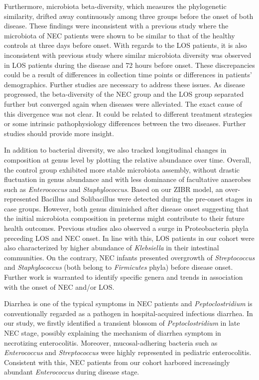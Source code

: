\documentclass[fleqn,10pt, lineno]{wlpeerj} %
\begin{document}
Furthermore, microbiota beta-diversity, which measures the phylogenetic similarity, drifted away continuously among three groups before the onset of both disease. These findings were inconsistent with a previous study where the microbiota of NEC patients were shown to be similar to that of the healthy controls at three days before onset\citep{mai2011fecal}. With regards to the LOS patients, it is also inconsistent with previous study where similar microbiota diversity was observed in LOS patients during the disease and 72 hours before onset\citep{mai2013distortions}. These discrepancies could be a result of differences in collection time points or differences in patients’ demographics.  Further studies are necessary to address these issues.  As disease progressed, the beta-diversity of the NEC group and the LOS group separated further but converged again when diseases were alleviated. The exact cause of this divergence was not clear. It could be related to different treatment strategies or some intrinsic pathophysiology differences between the two diseases. Further studies should provide more insight.

In addition to bacterial diversity, we also tracked longitudinal changes in composition at genus level by plotting the relative abundance over time. Overall, the control group exhibited more stable microbiota assembly, without drastic fluctuation in genus abundance and with less dominance of facultative anaerobes such as \textit{Enterococcus} and \textit{Staphylococcus}\citep{gibson2015antibiotics, la2014patterned, grier2017impact}. Based on our ZIBR model, an over-represented Bacillus and Solibacillus were detected during the pre-onset stages in case groups. However, both genus diminished after disease onset suggesting that the initial microbiota composition in preterms might contribute to their future health outcomes. Previous studies also observed a surge in Proteobacteria phyla\citep{mai2013distortions,mai2011fecal} preceding LOS and NEC onset. In line with this, LOS patients in our cohort were also characterized by higher abundance of \textit{Klebsiella} in their intestinal communities.  On the contrary, NEC infants presented overgrowth of \textit{Streptococcus} and \textit{Staphylococcus} (both belong to \textit{Firmicutes} phyla) before disease onset. Further work is warranted to identify specific genera and trends in association with the onset of NEC and/or LOS.

Diarrhea is one of the typical symptoms in NEC patients and \textit{Peptoclostridium} is conventionally regarded as a pathogen in hospital-acquired infectious diarrhea\citep{rodriguez2016clostridium, pereira2016complete}. In our study, we firstly identified a transient blossom of \textit{Peptoclostridium} in late NEC stage, possibly explaining the mechanism of diarrhea symptom in necrotizing enterocolitis. Moreover, mucosal-adhering bacteria such as \textit{Enterococcus} and \textit{Streptococcus} were highly represented in pediatric enterocolitis\citep{normann2013intestinal, zhou2016increased}. Consistent with this, NEC patients from our cohort harbored increasingly abundant \textit{Enterococcus} during disease stage.
\end{document}
